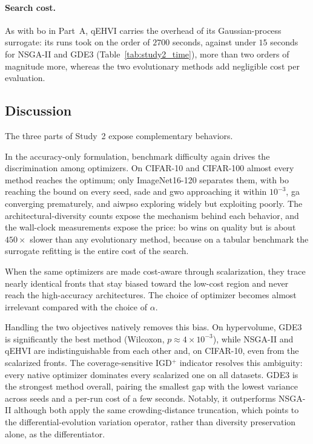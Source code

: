 \paragraph{Search cost.}
As with \acrshort{bo} in Part~A, qEHVI carries the overhead of its Gaussian-process surrogate: its runs took on the order of $2700$ seconds, against under $15$ seconds for NSGA-II and GDE3 (Table~\ref{tab:study2_time}), more than two orders of magnitude more, whereas the two evolutionary methods add negligible cost per evaluation.

\subsection{Discussion}
\label{subsec:study2_discussion}

The three parts of Study~2 expose complementary behaviors.

In the accuracy-only formulation, benchmark difficulty again drives the discrimination among optimizers. On CIFAR-10 and CIFAR-100 almost every method reaches the optimum; only ImageNet16-120 separates them, with \acrshort{bo} reaching the bound on every seed, \acrshort{sade} and \acrshort{gwo} approaching it within $10^{-3}$, \acrshort{ga} converging prematurely, and \acrshort{aiwpso} exploring widely but exploiting poorly. The architectural-diversity counts expose the mechanism behind each behavior, and the wall-clock measurements expose the price: \acrshort{bo} wins on quality but is about $450\times$ slower than any evolutionary method, because on a tabular benchmark the surrogate refitting is the entire cost of the search.

When the same optimizers are made cost-aware through scalarization, they trace nearly identical fronts that stay biased toward the low-cost region and never reach the high-accuracy architectures. The choice of optimizer becomes almost irrelevant compared with the choice of $\alpha$.

Handling the two objectives natively removes this bias. On hypervolume, GDE3 is significantly the best method (Wilcoxon, $p \approx 4 \times 10^{-3}$), while NSGA-II and qEHVI are indistinguishable from each other and, on CIFAR-10, even from the scalarized fronts. The coverage-sensitive IGD$^{+}$ indicator resolves this ambiguity: every native optimizer dominates every scalarized one on all datasets. GDE3 is the strongest method overall, pairing the smallest gap with the lowest variance across seeds and a per-run cost of a few seconds. Notably, it outperforms NSGA-II although both apply the same crowding-distance truncation, which points to the differential-evolution variation operator, rather than diversity preservation alone, as the differentiator.

